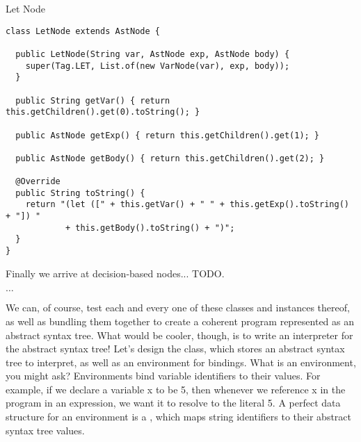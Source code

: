 \begin{cl}{Let Node}
\begin{lstlisting}[language=MyJava]
class LetNode extends AstNode {

  public LetNode(String var, AstNode exp, AstNode body) {
    super(Tag.LET, List.of(new VarNode(var), exp, body));
  }

  public String getVar() { return this.getChildren().get(0).toString(); }

  public AstNode getExp() { return this.getChildren().get(1); }

  public AstNode getBody() { return this.getChildren().get(2); }

  @Override
  public String toString() {
    return "(let ([" + this.getVar() + " " + this.getExp().toString() + "]) " 
            + this.getBody().toString() + ")";
  }
}
\end{lstlisting}
\end{cl}

Finally we arrive at decision-based nodes... TODO.

$\ldots$

We can, of course, test each and every one of these classes and instances thereof, as well as bundling them together to create a coherent program represented as an abstract syntax tree. What would be cooler, though, is to write an interpreter for the abstract syntax tree! Let's design the  class, which stores an abstract syntax tree to interpret, as well as an environment for bindings. What is an environment, you might ask? Environments bind variable identifiers to their values. For example, if we declare a variable x to be 5, then whenever we reference x in the program in an expression, we want it to resolve to the literal 5. A perfect data structure for an environment is a , which maps string identifiers to their abstract syntax tree values.